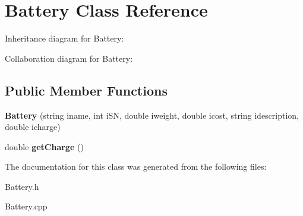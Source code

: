 \hypertarget{classBattery}{}\section{Battery Class Reference}
\label{classBattery}


Inheritance diagram for Battery\+:


Collaboration diagram for Battery\+:
\subsection*{Public Member Functions}
\begin{DoxyCompactItemize}
\item 
{\bfseries Battery} (string iname, int i\+SN, double iweight, double icost, string idescription, double icharge)\hypertarget{classBattery_ac0f8c6f4d61eb6c743a8c6671b236f23}{}\label{classBattery_ac0f8c6f4d61eb6c743a8c6671b236f23}

\item 
double {\bfseries get\+Charge} ()\hypertarget{classBattery_a4f9580c1692db2be0b4c077e42d5a9ab}{}\label{classBattery_a4f9580c1692db2be0b4c077e42d5a9ab}

\end{DoxyCompactItemize}


The documentation for this class was generated from the following files\+:\begin{DoxyCompactItemize}
\item 
Battery.\+h\item 
Battery.\+cpp\end{DoxyCompactItemize}

